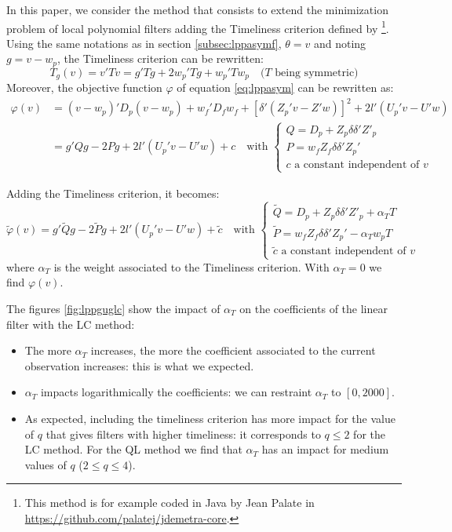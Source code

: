 \documentclass[
  12pt,
  ,
  a4paper]{article}
\newcommand\1{\mathds{1}}
\begin{document}
In this paper, we consider the method that consists to extend the minimization problem of local polynomial filters adding the Timeliness criterion defined by \textcite{ch15HBSA}\footnote{This method is for example coded in Java by Jean Palate in \url{https://github.com/palatej/jdemetra-core}.}.
Using the same notations as in section \ref{subsec:lppasymf}, \(\theta=v\) and noting \(g=v-w_p\), the Timeliness criterion can be rewritten:
\[
T_g(v)=v'Tv=g'Tg+2w_p'Tg+w_p'Tw_p
\quad(T\text{ being symmetric)}
\]
Moreover, the objective function \(\varphi\) of equation \eqref{eq:lppasym} can be rewritten as:
\begin{align*}
\varphi(v)&=(v-w_{p})'D_{p}(v-w_{p})+
  w_{f}'D_{f}w_{f}+
  [\delta'(Z_{p}'v-Z'w)]^{2}+
2l'(U_{p}'v-U'w)\\
&=g'Qg-2Pg+2l'(U_{p}'v-U'w)+c\quad\text{with }
\begin{cases}
Q=D_p+Z_p\delta\delta'Z'_p \\
P=w_fZ_f\delta\delta'Z_p'\\
c\text{ a constant independent of }v
\end{cases}
\end{align*}

Adding the Timeliness criterion, it becomes:
\[
\widetilde\varphi(v)=g'\widetilde Qg-
2\widetilde Pg+2l'(U_{p}'v-U'w)+
\widetilde c\quad\text{with }
\begin{cases}
\widetilde Q=D_p+Z_p\delta\delta'Z'_p +\alpha_TT\\
\widetilde P=w_fZ_f\delta\delta'Z_p'-\alpha_Tw_pT\\
\widetilde c\text{ a constant independent of }v
\end{cases}
\]
where \(\alpha_T\) is the weight associated to the Timeliness criterion. With \(\alpha_T=0\) we find \(\varphi(v)\).

The figures \ref{fig:lppguglc} show the impact of \(\alpha_T\) on the coefficients of the linear filter with the LC method:

\begin{itemize}
\item
  The more \(\alpha_T\) increases, the more the coefficient associated to the current observation increases: this is what we expected.
\item
  \(\alpha_T\) impacts logarithmically the coefficients: we can restraint \(\alpha_T\) to \([0,2000]\).
\item
  As expected, including the timeliness criterion has more impact for the value of \(q\) that gives filters with higher timeliness: it corresponds to \(q\leq2\) for the LC method.
  For the QL method we find that \(\alpha_T\) has an impact for medium values of \(q\) (\(2\leq q\leq4\)).
\end{itemize}
\end{document}
